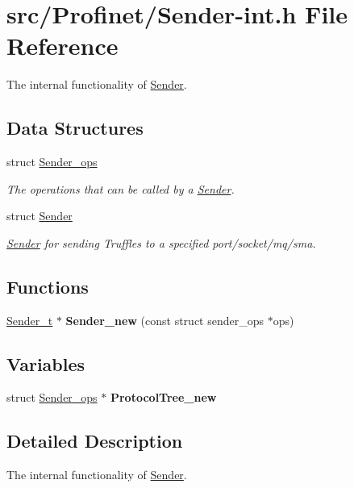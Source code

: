 \hypertarget{_sender-int_8h}{}\section{src/\+Profinet/\+Sender-\/int.h File Reference}
\label{_sender-int_8h}


The internal functionality of \hyperlink{struct_sender}{Sender}.  


\subsection*{Data Structures}
\begin{DoxyCompactItemize}
\item 
struct \hyperlink{struct_sender__ops}{Sender\+\_\+ops}
\begin{DoxyCompactList}\small\item\em The operations that can be called by a \hyperlink{struct_sender}{Sender}. \end{DoxyCompactList}\item 
struct \hyperlink{struct_sender}{Sender}
\begin{DoxyCompactList}\small\item\em \hyperlink{struct_sender}{Sender} for sending Truffles to a specified port/socket/mq/sma. \end{DoxyCompactList}\end{DoxyCompactItemize}
\subsection*{Functions}
\begin{DoxyCompactItemize}
\item 
\hypertarget{_sender-int_8h_a8fd47a704efa4b163bce4835be401bd9}{}\hyperlink{struct_sender}{Sender\+\_\+t} $\ast$ {\bfseries Sender\+\_\+new} (const struct sender\+\_\+ops $\ast$ops)\label{_sender-int_8h_a8fd47a704efa4b163bce4835be401bd9}

\end{DoxyCompactItemize}
\subsection*{Variables}
\begin{DoxyCompactItemize}
\item 
\hypertarget{_sender-int_8h_aeda9b8cd79a841683977a04b7e28c195}{}struct \hyperlink{struct_sender__ops}{Sender\+\_\+ops} $\ast$ {\bfseries Protocol\+Tree\+\_\+new}\label{_sender-int_8h_aeda9b8cd79a841683977a04b7e28c195}

\end{DoxyCompactItemize}


\subsection{Detailed Description}
The internal functionality of \hyperlink{struct_sender}{Sender}. 

